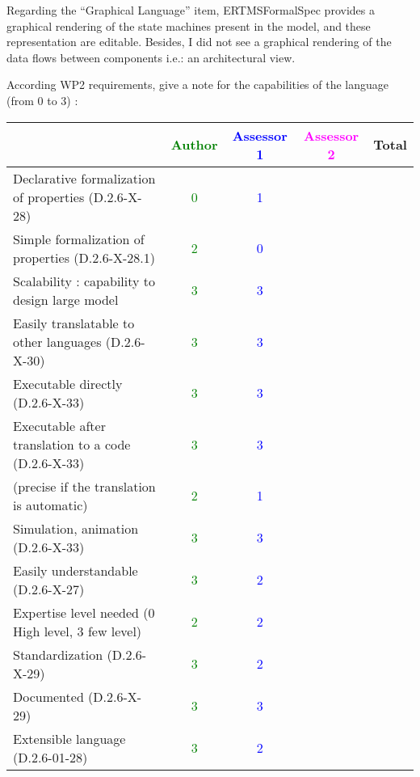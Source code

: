 \begin{assessor1}
Regarding the "`Graphical Language"' item, ERTMSFormalSpec provides a graphical rendering of the state machines present in the model, and these representation are editable. Besides, I did not see a graphical rendering of the data flows between components i.e.: an architectural view. 
\end{assessor1}

According WP2 requirements, give a note for the capabilities of the language (from 0 to 3) :

\begin{tabular}{|l | c | c | c | c|}
\hline
& \textcolor{green}{Author} & \textcolor{blue}{Assessor 1} & \textcolor{magenta}{Assessor 2} & Total \\
\hline
Declarative formalization of properties (D.2.6-X-28) & \textcolor{green}{0} & \textcolor{blue}{1} & & \\
\hline
Simple formalization of properties (D.2.6-X-28.1) & \textcolor{green}{2} & \textcolor{blue}{0} & & \\
\hline
Scalability : capability to design large model & \textcolor{green}{3} & \textcolor{blue}{3} & & \\
\hline
Easily translatable to other languages (D.2.6-X-30) & \textcolor{green}{3} & \textcolor{blue}{3} & & \\
\hline
Executable directly (D.2.6-X-33) & \textcolor{green}{3} & \textcolor{blue}{3} & & \\
\hline
Executable after translation to a code (D.2.6-X-33) & \textcolor{green}{3} & \textcolor{blue}{3} & & \\
(precise if the translation is automatic) & \textcolor{green}{2} & \textcolor{blue}{1} & & \\
\hline
Simulation, animation (D.2.6-X-33) & \textcolor{green}{3} & \textcolor{blue}{3} & & \\
\hline
Easily understandable (D.2.6-X-27) & \textcolor{green}{3} & \textcolor{blue}{2} & & \\
\hline
Expertise level needed (0 High level, 3 few level) & \textcolor{green}{2} & \textcolor{blue}{2} & & \\
\hline
Standardization (D.2.6-X-29) & \textcolor{green}{3} & \textcolor{blue}{2} & & \\
\hline
Documented (D.2.6-X-29) & \textcolor{green}{3} & \textcolor{blue}{3} & & \\
\hline
Extensible language (D.2.6-01-28) & \textcolor{green}{3} & \textcolor{blue}{2} & & \\
\hline
\end{tabular}

